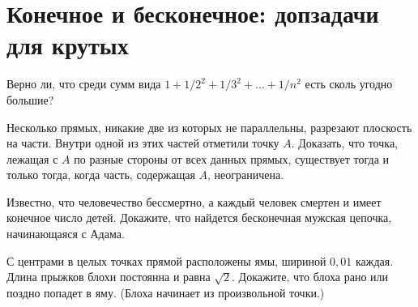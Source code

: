 
\section*{Конечное и бесконечное: допзадачи для крутых}




\begin{problems}

Верно ли, что среди сумм вида $1 + 1 / 2^2 + 1 / 3^2 + \ldots + 1 /n^2$ есть
сколь угодно большие?

Несколько прямых, никакие две из которых не параллельны, разрезают плоскость
на части.
Внутри одной из этих частей отметили точку $A$.
Доказать, что точка, лежащая с $A$ по разные стороны от всех данных прямых,
существует тогда и только тогда, когда часть, содержащая $A$, неограничена.

Известно, что человечество бессмертно, а каждый человек смертен и имеет
конечное число детей.
Докажите, что найдется бесконечная мужская цепочка, начинающаяся с Адама.

С центрами в целых точках прямой расположены ямы, шириной $0{,}01$ каждая.
Длина прыжков блохи постоянна и равна $\sqrt{2}$.
Докажите, что блоха рано или поздно попадет в яму.
(Блоха начинает из произвольной точки.)

\end{problems}

